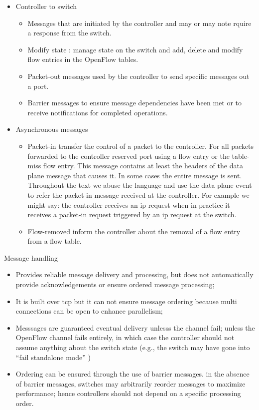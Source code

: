 \begin{itemize}
\begin{itemize}
\item Controller to switch
  \begin{itemize}
  \item Messages that are initiated by the controller and may or may note rquire a response from the switch. 
\item Modify state : manage state on the switch and add, delete and modify flow entries in  the OpenFlow tables. 
  \item Packet-out messages used by the controller to send specific messages out a port. 
  \item Barrier messages to ensure message dependencies have been met or to receive notifications for completed operations. 
  \end{itemize}
\item Asynchronous messages 
  \begin{itemize}
  \item Packet-in transfer the control of a packet to the controller. For all packets forwarded to the controller reserved port using a flow entry or the table-miss flow entry. This message contains at least the headers of the data plane message that causes it. In some cases the entire message is sent. Throughout the text we abuse the language and use  the data plane event to refer the packet-in message received at the controller. For example we might say: the controller receives an \gls{ip} request when in practice it receives a packet-in request triggered by an \gls{ip} request at the switch. 
  \item Flow-removed inform the controller about the removal of a flow entry from a flow table. 
  \end{itemize}

\end{itemize}


Message handling
\begin{itemize}
\item Provides reliable message delivery and processing, but does not automatically provide acknowledgements or ensure ordered message processing;
\item It is built over \gls{tcp} but it can not ensure message ordering because multi connections can be open to enhance parallelism; 
\item Messsages are guaranteed eventual delivery unlesss the channel fail; unless the OpenFlow channel fails entirely, in which case the controller should not assume anything about the switch state (e.g., the switch may have gone into ``fail standalone mode'' ) 
\item Ordering can be ensured through the use of barrier messages. in the absence of barrier messages, switches may arbitrarily reorder messages to maximize performance; hence controllers should not depend on a specific processing order. 
\end{itemize}


\end{itemize}
